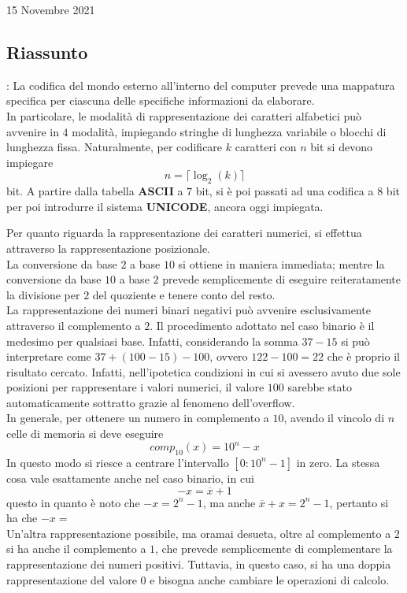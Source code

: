 \documentclass[a4paper]{extarticle}
\begin{document}
\newpage
\begin{center}
    15 Novembre 2021
\end{center}
\subsection{Riassunto}: La codifica del mondo esterno all'interno del computer prevede una mappatura specifica per ciascuna delle specifiche informazioni  da elaborare.\\
In particolare, le modalità di rappresentazione dei caratteri alfabetici può avvenire in \(4\) modalità, impiegando stringhe di lunghezza variabile o blocchi di lunghezza fissa. Naturalmente, per codificare \(k\) caratteri con \(n\) bit si devono impiegare
\[n = \lceil \log_2(k) \rceil\]
bit. A partire dalla tabella \textbf{ASCII} a \(7\) bit, si è poi passati ad una codifica a \(8\) bit per poi introdurre il sistema \textbf{UNICODE}, ancora oggi impiegata.

\vspace{1em}
\noindent
Per quanto riguarda la rappresentazione dei caratteri numerici, si effettua attraverso la rappresentazione posizionale.\\
La conversione da base \(2\) a base \(10\) si ottiene in maniera immediata; mentre la conversione da base \(10\) a base \(2\) prevede semplicemente di eseguire reiteratamente la divisione per \(2\) del quoziente e tenere conto del resto.\\
La rappresentazione dei numeri binari negativi può avvenire esclusivamente attraverso il complemento a \(2\). Il procedimento adottato nel caso binario è il medesimo per qualsiasi base. Infatti, considerando la somma \(37 - 15\) si può interpretare come \(37 + (100 - 15) - 100\), ovvero \(122 - 100 = 22\) che è proprio il risultato cercato. Infatti, nell'ipotetica condizioni in cui si avessero avuto due sole posizioni per rappresentare i valori numerici, il valore \(100\) sarebbe stato automaticamente sottratto grazie al fenomeno dell'overflow.\\
In generale, per ottenere un numero in complemento a \(10\), avendo il vincolo di \(n\) celle di memoria si deve eseguire
\[comp_{10}(x) = 10^{n} - x\]
In questo modo si riesce a centrare l'intervallo \(\left[ 0 : 10^{n} - 1 \right]\) in zero. La stessa cosa vale esattamente anche nel caso binario, in cui
\[-x = \overline{x} + 1\]
questo in quanto è noto che \(-x = 2^{n} - 1\), ma anche \(\overline{x} + x = 2^{n} - 1\), pertanto si ha che \(-x = \)\\
Un'altra rappresentazione possibile, ma oramai desueta, oltre al complemento a \(2\) si ha anche il complemento a \(1\), che prevede semplicemente di complementare la rappresentazione dei numeri positivi. Tuttavia, in questo caso, si ha una doppia rappresentazione del valore \(0\) e bisogna anche cambiare le operazioni di calcolo.\\
\end{document}
